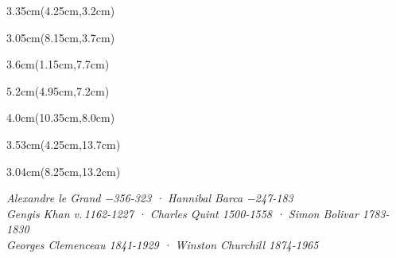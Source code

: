 \noindent\begin{minipage}[t][\textheight][s]{\textwidth}


\begin{textblock*}{3.35cm}(4.25cm,3.2cm)
%
\end{textblock*}

\begin{textblock*}{3.05cm}(8.15cm,3.7cm)
%
\end{textblock*}


\begin{textblock*}{3.6cm}(1.15cm,7.7cm)
%
\end{textblock*}

\begin{textblock*}{5.2cm}(4.95cm,7.2cm)
%
\end{textblock*}

\begin{textblock*}{4.0cm}(10.35cm,8.0cm)
%
\end{textblock*}


\begin{textblock*}{3.53cm}(4.25cm,13.7cm)
%
\end{textblock*}

\begin{textblock*}{3.04cm}(8.25cm,13.2cm)
%
\end{textblock*}

\vfill
\centering\figcaptionname\textit{
    Alexandre le Grand \textup{−356-323} · Hannibal Barca \textup{−247-183}\\[0.3em]
    Gengis Khan \textup{v.\,1162-1227} · Charles Quint \textup{1500-1558} · Simon Bolivar \textup{1783-1830}\\[0.3em]
    Georges Clemenceau \textup{1841-1929} · Winston Churchill \textup{1874-1965}\\[0.3em]
}

\end{minipage}


